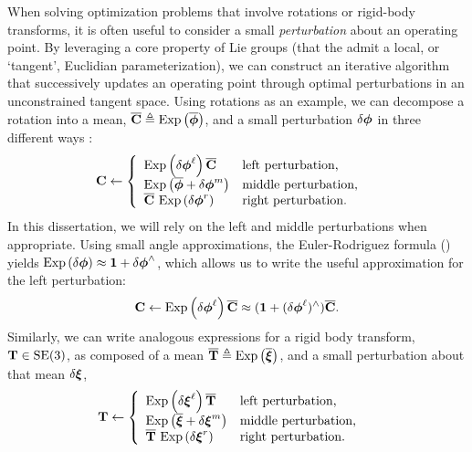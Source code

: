 When solving optimization problems that involve rotations or rigid-body transforms, it is often useful to consider a small \textit{perturbation} about an operating point. By leveraging a core property of Lie groups (that the admit a local, or `tangent', Euclidian parameterization), we can construct an iterative algorithm that successively updates an operating point through optimal perturbations in an unconstrained tangent space.
Using rotations as an example, we can decompose a rotation into a mean, $\overline{\boldsymbol{\mathbf{C}}} \triangleq \mathrm{Exp}\left({\overline{\boldsymbol{\mathbf{\phi}}}}\right)$, and a small perturbation $\delta \boldsymbol{\mathbf{\phi}}$ in three different ways \citep{Barfoot2017-ri}:
\begin{align}
\boldsymbol{\mathbf{C}} &\leftarrow \left\{  	\begin{array}{ll}
		\mathrm{Exp}\left({\delta \boldsymbol{\mathbf{\phi}}^\ell}\right) \overline{\boldsymbol{\mathbf{C}}}   & \mbox{left perturbation,} \\
		\mathrm{Exp}\left({\overline{\boldsymbol{\mathbf{\phi}}} + \delta \boldsymbol{\mathbf{\phi}}^m}\right)  & \mbox{middle perturbation,} \\
		\overline{\boldsymbol{\mathbf{C}}} ~ \mathrm{Exp}\left({\delta \boldsymbol{\mathbf{\phi}}^r}\right)  & \mbox{right perturbation.}  \\
	\end{array}
	\right.
\end{align}
In this dissertation, we will rely on the left and middle perturbations when appropriate. Using small angle approximations, the Euler-Rodriguez formula () yields $\mathrm{Exp}\left({\delta \boldsymbol{\mathbf{\phi}}}\right) \approx \boldsymbol{\mathbf{1}} + \delta \boldsymbol{\mathbf{\phi}}^\wedge$, which allows us to write the useful approximation for the left perturbation:
\begin{equation}
	\boldsymbol{\mathbf{C}} \leftarrow \mathrm{Exp}\left({\delta \boldsymbol{\mathbf{\phi}}^\ell}\right) \overline{\boldsymbol{\mathbf{C}}} \approx (\boldsymbol{\mathbf{1}} + (\delta \boldsymbol{\mathbf{\phi}}^\ell)^\wedge) \overline{\boldsymbol{\mathbf{C}}}.
\end{equation}
Similarly, we can write analogous expressions for a rigid body transform, $\boldsymbol{\mathbf{T}} \in \mathrm{SE}(3)$, as composed of a mean $\overline{\boldsymbol{\mathbf{T}}} \triangleq \mathrm{Exp}\left({\overline{\boldsymbol{\mathbf{\xi}}}}\right)$, and a small perturbation about that mean $\delta \boldsymbol{\mathbf{\xi}}$,
\begin{align}
\boldsymbol{\mathbf{T}} &\leftarrow \left\{  	\begin{array}{ll}
		\mathrm{Exp}\left({\delta \boldsymbol{\mathbf{\xi}}^\ell}\right) \overline{\boldsymbol{\mathbf{T}}}   & \mbox{left perturbation,} \\
		\mathrm{Exp}\left({\overline{\boldsymbol{\mathbf{\xi}}} + \delta \boldsymbol{\mathbf{\xi}}^m}\right)  & \mbox{middle perturbation,} \\
		\overline{\boldsymbol{\mathbf{T}}} ~ \mathrm{Exp}\left({\delta \boldsymbol{\mathbf{\xi}}^r}\right)  & \mbox{right perturbation.}  \\
	\end{array}
	\right.
\end{align}
